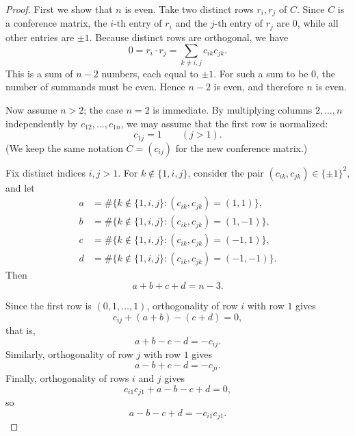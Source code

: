 \documentclass[11pt, a4paper]{ctexrep}
\begin{document}
\begin{proof}
    First we show that \(n\) is even.
    Take two distinct rows \(r_i,r_j\) of \(C\).
    Since \(C\) is a conference matrix, the \(i\)-th entry of \(r_i\) and the \(j\)-th entry of \(r_j\) are \(0\),
    while all other entries are \(\pm1\).
    Because distinct rows are orthogonal, we have
    \[
        0=r_i\cdot r_j=\sum_{k\neq i,j} c_{ik}c_{jk}.
    \]
    This is a sum of \(n-2\) numbers, each equal to \(\pm1\).
    For such a sum to be \(0\), the number of summands must be even.
    Hence \(n-2\) is even, and therefore \(n\) is even.

    \medskip
    Now assume \(n>2\); the case \(n=2\) is immediate.
    By multiplying columns \(2,\dots,n\) independently by \(c_{12},\dots,c_{1n}\),
    we may assume that the first row is normalized:
    \[
        c_{1j}=1 \qquad (j>1).
    \]
    (We keep the same notation \(C=(c_{ij})\) for the new conference matrix.)

    Fix distinct indices \(i,j>1\).
    For \(k\notin\{1,i,j\}\), consider the pair \((c_{ik},c_{jk})\in\{\pm1\}^2\), and let
    \[
        \begin{aligned}
            a & =\#\{k\notin\{1,i,j\}: (c_{ik},c_{jk})=(1,1)\},   \\
            b & =\#\{k\notin\{1,i,j\}: (c_{ik},c_{jk})=(1,-1)\},  \\
            c & =\#\{k\notin\{1,i,j\}: (c_{ik},c_{jk})=(-1,1)\},  \\
            d & =\#\{k\notin\{1,i,j\}: (c_{ik},c_{jk})=(-1,-1)\}.
        \end{aligned}
    \]
    Then
    \[
        a+b+c+d=n-3.
    \]

    Since the first row is \((0,1,\dots,1)\), orthogonality of row \(i\) with row \(1\) gives
    \[
        c_{ij}+(a+b)-(c+d)=0,
    \]
    that is,
    \[
        a+b-c-d=-c_{ij}. \tag{1}
    \]
    Similarly, orthogonality of row \(j\) with row \(1\) gives
    \[
        a-b+c-d=-c_{ji}. \tag{2}
    \]
    Finally, orthogonality of rows \(i\) and \(j\) gives
    \[
        c_{i1}c_{j1}+a-b-c+d=0,
    \]
    so
    \[
        a-b-c+d=-c_{i1}c_{j1}. \tag{3}
    \]


\end{proof}
\end{document}
